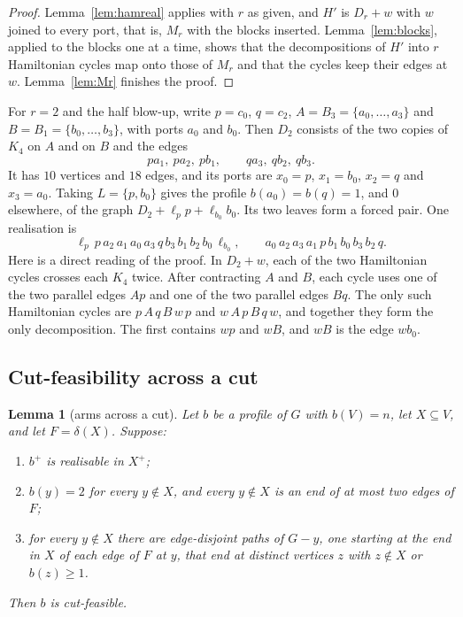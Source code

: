 \documentclass[11pt]{amsart}
\newtheorem{lemma}[theorem]{Lemma}
\theoremstyle{definition}
\begin{document}
\begin{proof}
Lemma~\ref{lem:hamreal} applies with $r$ as given, and $H'$ is $D_r+w$ with $w$ joined to every port,
that is, $M_r$ with the blocks inserted. Lemma~\ref{lem:blocks}, applied to the blocks one at a time,
shows that the decompositions of $H'$ into $r$ Hamiltonian cycles map onto those of $M_r$ and that the
cycles keep their edges at $w$. Lemma~\ref{lem:Mr} finishes the proof.
\end{proof}

For $r=2$ and the half blow-up, write $p=c_0$, $q=c_2$, $A=B_3=\{a_0,\dots,a_3\}$ and $B=B_1=\{b_0,\dots,b_3\}$,
with ports $a_0$ and $b_0$. Then $D_2$ consists of the two copies of $K_4$ on $A$ and on $B$ and the
edges
\[
pa_1,\ pa_2,\ pb_1,\qquad qa_3,\ qb_2,\ qb_3.
\]
It has $10$ vertices and $18$ edges, and its ports are $x_0=p$, $x_1=b_0$, $x_2=q$ and $x_3=a_0$.
Taking $L=\{p,b_0\}$
gives the profile $b(a_0)=b(q)=1$, and $0$ elsewhere, of the graph $D_2+\ell_pp+\ell_{b_0}b_0$. Its
two leaves form a forced pair. One realisation is
\[
\ell_p\,p\,a_2\,a_1\,a_0\,a_3\,q\,b_3\,b_1\,b_2\,b_0\,\ell_{b_0},\qquad
a_0\,a_2\,a_3\,a_1\,p\,b_1\,b_0\,b_3\,b_2\,q .
\]
Here is a direct reading of the proof. In $D_2+w$, each of the two Hamiltonian cycles crosses each
$K_4$ twice. After contracting $A$ and $B$, each cycle uses one of the two parallel edges $Ap$ and one
of the two parallel edges $Bq$. The only such Hamiltonian cycles are $p\,A\,q\,B\,w\,p$ and
$w\,A\,p\,B\,q\,w$, and together they form the only decomposition. The first contains $wp$ and $wB$,
and $wB$ is the edge $wb_0$.

\subsection{Cut-feasibility across a cut}

\begin{lemma}[arms across a cut]\label{lem:armscut}
Let $b$ be a profile of $G$ with $b(V)=n$, let $X\subseteq V$, and let $F=\delta(X)$. Suppose:
\begin{enumerate}
\item[(i)] $b^+$ is realisable in $X^+$;
\item[(ii)] $b(y)=2$ for every $y\notin X$, and every $y\notin X$ is an end of at most two edges of
$F$;
\item[(iii)] for every $y\notin X$ there are edge-disjoint paths of $G-y$, one starting at the end in
$X$ of each edge of $F$ at $y$, that end at distinct vertices $z$ with $z\notin X$ or $b(z)\ge1$.
\end{enumerate}
Then $b$ is cut-feasible.
\end{lemma}
\end{document}
